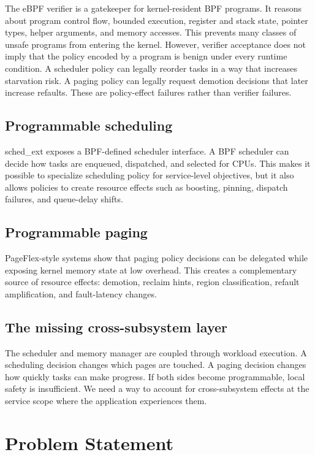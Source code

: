 \documentclass[letterpaper,twocolumn,10pt]{article}
\begin{document}
The eBPF verifier is a gatekeeper for kernel-resident BPF programs. It reasons about program control flow, bounded execution, register and stack state, pointer types, helper arguments, and memory accesses. This prevents many classes of unsafe programs from entering the kernel. However, verifier acceptance does not imply that the policy encoded by a program is benign under every runtime condition. A scheduler policy can legally reorder tasks in a way that increases starvation risk. A paging policy can legally request demotion decisions that later increase refaults. These are policy-effect failures rather than verifier failures.

\subsection{Programmable scheduling}

sched\_ext exposes a BPF-defined scheduler interface. A BPF scheduler can decide how tasks are enqueued, dispatched, and selected for CPUs. This makes it possible to specialize scheduling policy for service-level objectives, but it also allows policies to create resource effects such as boosting, pinning, dispatch failures, and queue-delay shifts.

\subsection{Programmable paging}

PageFlex-style systems show that paging policy decisions can be delegated while exposing kernel memory state at low overhead. This creates a complementary source of resource effects: demotion, reclaim hints, region classification, refault amplification, and fault-latency changes.

\subsection{The missing cross-subsystem layer}

The scheduler and memory manager are coupled through workload execution. A scheduling decision changes which pages are touched. A paging decision changes how quickly tasks can make progress. If both sides become programmable, local safety is insufficient. We need a way to account for cross-subsystem effects at the service scope where the application experiences them.

\section{Problem Statement}
\end{document}
